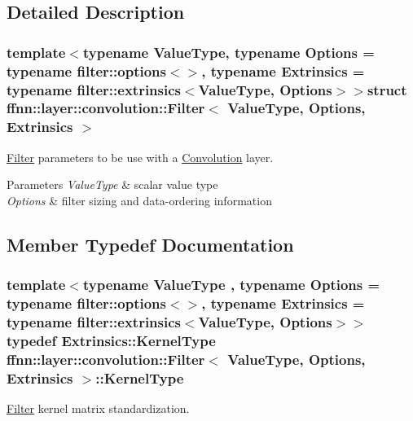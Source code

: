 \subsection{Detailed Description}
\subsubsection*{template$<$typename Value\-Type, typename Options = typename filter\-::options$<$$>$, typename Extrinsics = typename filter\-::extrinsics$<$\-Value\-Type, Options$>$$>$struct ffnn\-::layer\-::convolution\-::\-Filter$<$ Value\-Type, Options, Extrinsics $>$}

\hyperlink{structffnn_1_1layer_1_1convolution_1_1_filter}{Filter} parameters to be use with a \hyperlink{classffnn_1_1layer_1_1_convolution}{Convolution} layer. 


\begin{DoxyParams}{Parameters}
{\em Value\-Type} & scalar value type \\
\hline
{\em Options} & filter sizing and data-\/ordering information \\
\hline
\end{DoxyParams}


\subsection{Member Typedef Documentation}
\hypertarget{structffnn_1_1layer_1_1convolution_1_1_filter_ad5cce121107613f7bfd80ff7df649b96}{
\subsubsection[{Kernel\-Type}]{\setlength{\rightskip}{0pt plus 5cm}template$<$typename Value\-Type , typename Options  = typename filter\-::options$<$$>$, typename Extrinsics  = typename filter\-::extrinsics$<$\-Value\-Type, Options$>$$>$ typedef Extrinsics\-::\-Kernel\-Type {\bf ffnn\-::layer\-::convolution\-::\-Filter}$<$ Value\-Type, Options, Extrinsics $>$\-::{\bf Kernel\-Type}}}\label{structffnn_1_1layer_1_1convolution_1_1_filter_ad5cce121107613f7bfd80ff7df649b96}


\hyperlink{structffnn_1_1layer_1_1convolution_1_1_filter}{Filter} kernel matrix standardization. 



